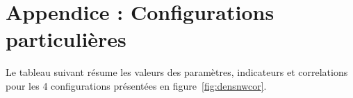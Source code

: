 \footnotesize








\newpage

\normalsize


\section*{Appendice : Configurations particulières}

Le tableau suivant résume les valeurs des paramètres, indicateurs et correlations pour les 4 configurations présentées en figure~\ref{fig:densnwcor}.

